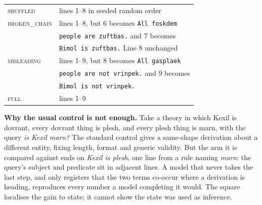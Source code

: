 \documentclass{article}
\begin{document}
\begin{table}[tb]
\begin{minipage}[t]{0.58\textwidth}
\begin{tabular}{@{}ll@{}}
\textsc{shuffled}    & lines 1--8 in seeded random order \\
\textsc{broken\_chain} & lines 1--8, but 6 becomes \texttt{All foskdem} \\
                     & \texttt{people are zuftbas.} and 7 becomes \\
                     & \texttt{Bimol is zuftbas.} Line 8 unchanged \\
\textsc{misleading}  & lines 1--9, but 8 becomes \texttt{All gasplaek} \\
                     & \texttt{people are not vrinpek.} and 9 becomes \\
                     & \texttt{Bimol is not vrinpek.} \\
\textsc{full}        & lines 1--9 \\
\bottomrule
\end{tabular}
\end{minipage}
\end{table}

\textbf{Why the usual control is not enough.} Take a theory in which Kexil is dovrant,
every dovrant thing is plesh, and every plesh thing is marn, with the query
\emph{is Kexil marn?} The standard control gives a same-shape derivation about a
different entity, fixing length, format and generic validity. But the arm it is
compared against ends on \emph{Kexil is plesh}, one line from a rule naming
\emph{marn}: the query's subject and predicate sit in adjacent lines. A model
that never takes the last step, and only registers that the two terms co-occur
where a derivation is heading, reproduces every number a model completing it
would. The square localises the gain to state; it cannot show the state was used
as inference.
\end{document}
